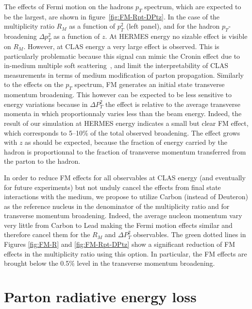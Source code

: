The effects of Fermi motion on the hadrons $p_T$ spectrum, which are expected to be the largest, are shown in figure~\ref{fig:FM-Rpt-DPtz}. In the case of the multiplicity ratio $R_M$ as a function of $p_T^2$ (left panel), and for the 
hadron $p_T$-broadening $\Delta p_T^2$ as a function of $z$.
At HERMES energy no sizable effect is visible on $R_M$. However, at CLAS energy a very large effect is observed. This is particularly problematic because this signal can mimic the Cronin effect due to in-medium multiple soft scattering~\cite{Kopeliovich:2003py}, and limit the interpretability of CLAS measurements in terms of medium modification of parton propagation.
Similarly to the effects on the $p_T$ spectrum, FM generates an initial state transverse momentum broadening. This however can be expected to be less sensitive to energy variations because in $\Delta P_T^2$ the effect is relative to the average transverse momenta in which proportionnaly varies less than the beam energy.
Indeed, the result of our simulation at HERMES energy indicates a small but clear FM effect, which corresponds to 5--10\% of the total observed broadening. The effect grows with $z$ as should be expected, because the fraction of energy carried by the hadron is proportionnal to the fraction of transverse momentum transferred from the parton to the hadron. 

In order to reduce FM effects for all observables at CLAS energy (and eventually for future experiments) but not unduly cancel the effects from final state interactions with the medium, we propose to utilize Carbon (instead of Deuteron) as the reference nucleus in the denominator of the multiplicity ratio and for transverse momentum broadening. Indeed, the average nucleon momentum vary very little from Carbon to Lead \cite{CiofidegliAtti:1995qe} making the Fermi motion effects similar and therefore cancel them for the $R_M$ and $\Delta P_T^2$ observables. The green dotted lines in Figures \ref{fig:FM-R} and \ref{fig:FM-Rpt-DPtz} show a significant reduction of FM effects in the multiplicity ratio using this option. In particular, the FM effects are brought below the 0.5\% level in the transverse momentum broadening.


\section{Parton radiative energy loss}
\label{sec:qweights}

